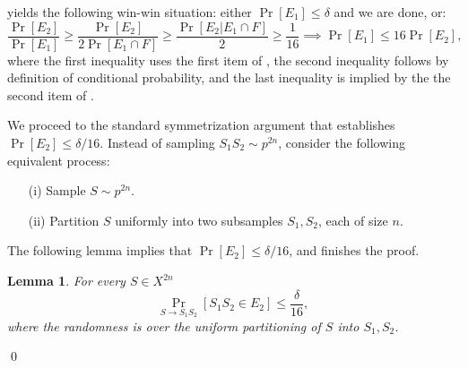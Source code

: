 \documentclass{article}
\newtheorem{lemma}[theorem]{Lemma}
\begin{document}
 yields the following win-win situation:
either $\Pr[E_1] \leq \delta$ and we are done, or:
\[\frac{\Pr[E_2]}{\Pr[E_1]} \geq  \frac{\Pr[E_2]}{2\Pr[E_1\cap F]} \geq \frac{\Pr[E_2 \vert E_1\cap F]}{2} \geq \frac{1}{16}
\implies  \Pr[E_1]\leq 16\Pr[E_2],\]
where the first inequality uses the first item of , 
the second inequality follows by definition of conditional probability,
and the last inequality is implied by the the second item of .


We proceed to the standard symmetrization argument
that establishes $\Pr[E_2]\leq\delta/16$. 
Instead of sampling $S_1S_2\sim p^{2n}$,
consider the following equivalent process:
\begin{itemize}
\item[(i)] Sample $S\sim p^{2n}$.
\item[(ii)] Partition $S$ uniformly into two subsamples $S_1,S_2$, each of size $n$.
\end{itemize}
The following lemma implies that $\Pr[E_2]\leq \delta/16$, and finishes the proof.
\begin{lemma}\label{lem:e2}
For every $S\in X^{2n}$
\[\Pr_{S\to S_1S_2}\left[S_1S_2\in E_2\right]\leq \frac{\delta}{16},\]
where the randomness is over the uniform partitioning
of $S$ into $S_1,S_2$.
\end{lemma}
\qed
\end{document}
